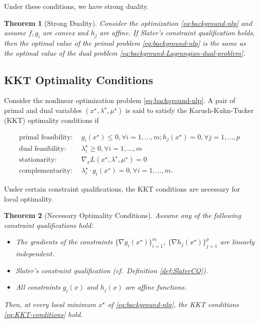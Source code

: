 \documentclass[
]{book}
\newtheorem{theorem}{Theorem}[chapter]
\theoremstyle{definition}
\theoremstyle{definition}
\theoremstyle{definition}
\theoremstyle{definition}
\theoremstyle{remark}
\begin{document}
Under these conditions, we have strong duality.

\begin{theorem}[Strong Duality]
\protect\hypertarget{thm:StrongDuality}{}\label{thm:StrongDuality}Consider the optimization \eqref{eq:background-nlp} and assume \(f,g_i\) are convex and \(h_j\) are affine. If Slater's constraint qualification holds, then the optimal value of the primal problem \eqref{eq:background-nlp} is the same as the optimal value of the dual problem \eqref{eq:background-Lagrangian-dual-problem}.
\end{theorem}

\hypertarget{kkt-optimality-conditions}{%
\subsection{KKT Optimality Conditions}\label{kkt-optimality-conditions}}

Consider the nonlinear optimization problem \eqref{eq:background-nlp}. A pair of primal and dual variables \((x^\star,\lambda^\star,\mu^\star)\) is said to satisfy the Karush-Kuhn-Tucker (KKT) optimality conditions if

\begin{equation}
\begin{split}
\text{primal feasibility}:\ \  & g_i(x^\star) \leq 0,\forall i=1,\dots,m; h_j(x^\star) = 0, \forall j=1,\dots,p \\
\text{dual feasibility}:\ \  & \lambda_i^\star \geq 0, \forall i=1,\dots,m \\
\text{stationarity}:\ \  & \nabla_x L(x^\star,\lambda^\star,\mu^\star) = 0 \\
\text{complementarity}:\ \  & \lambda_i^\star \cdot g_i(x^\star) = 0, \forall i=1,\dots,m.
\end{split}
\label{eq:KKT-conditions}
\end{equation}

Under certain constraint qualifications, the KKT conditions are necessary for local optimality.

\begin{theorem}[Necessary Optimality Conditions]
\protect\hypertarget{thm:KKTNecessary}{}\label{thm:KKTNecessary}Assume any of the following constraint qualifications hold:

\begin{itemize}
\item
  The gradients of the constraints \(\{ \nabla g_i(x^\star) \}_{i=1}^m\), \(\{ \nabla h_j(x^\star) \}_{j=1}^p\) are linearly independent.
\item
  Slater's constraint qualification (cf.~Definition \ref{def:SlaterCQ}).
\item
  All constraints \(g_i(x)\) and \(h_j(x)\) are affine functions.
\end{itemize}

Then, at every local minimum \(x^\star\) of \eqref{eq:background-nlp}, the KKT conditions \eqref{eq:KKT-conditions} hold.
\end{theorem}
\end{document}
